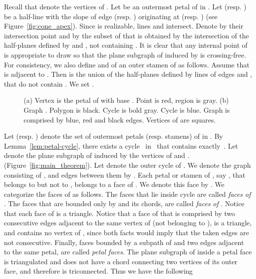 \documentclass{llncs}
\begin{document}
Recall that  denote the vertices of . Let  be an outermost petal of  in . 
Let  (resp. ) be a half-line with the slope of edge  (resp. ) originating at  (resp. )
 (see
Figure~\ref{fig:cone_apex}). Since  is realizable, 
lines  and  intersect. Denote by  their
intersection point and by  the subset of  that
is obtained by the intersection of the half-planes defined by  and , not containing 
. It is clear that any internal point of 
 is appropriate to draw  so that the plane subgraph of 
induced by  is crossing-free. For consistency, we also define  and 
 of an outer stamen  of  as follows. Assume that  is adjacent to . Then  is the union of the half-planes defined by lines of edges  and , that do not contain . We set .  

\begin{figure}[t]
 \centering
 \hspace{+1cm}
 \caption{(a) Vertex  is the petal of  with base . Point  is red, region  is gray. (b) Graph . Polygon  is black. Cycle  is bold gray. Cycle  is blue. Graph  is comprised by blue, red and black edges. Vertices of  are squares. }
\end{figure}


Let  (resp. ) denote the set of outermost petals (resp. stamens) of  in . 
By Lemma~\ref{lem:petal-cycle}, there exists a cycle~ in~ that
contains exactly~. Let  denote
the plane subgraph of  induced by the vertices of  and . (Figure~\ref{fig:main_theorem}). Let  denote the outer cycle of . We denote the graph consisting of ,  and edges between them by . Each petal or stamen of , say , that belongs to  but not to , belongs to a face of . We denote this face by . 
We categorize the faces of  as follows. The faces that lie inside cycle  are called \emph{faces of }.  The faces that are bounded only by  and its chords, are called \emph{faces of }. Notice that each face of  is a triangle. 
Notice that a face of  that is comprised by two consecutive edges adjacent to the same vertex of  (not belonging to ), is a triangle, and contains no vertex of , since both facts would imply that the taken edges are not consecutive.
Finally, faces bounded by a subpath of  and two edges adjacent to the same petal, are called \emph{petal faces}. The plane subgraph of  inside a petal face is triangulated and does not have a chord connecting two vertices of its outer face, and therefore is triconnected.  Thus we have the following 
\end{document}
